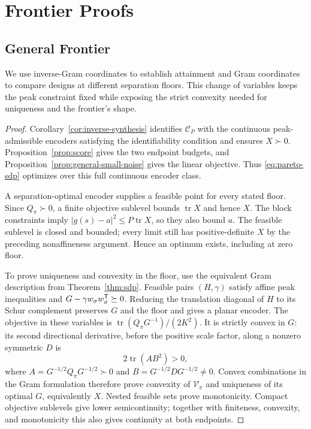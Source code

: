 \section{Frontier Proofs}\label{app:frontier-proofs}

\subsection{General Frontier}\label{app:general-frontier-proof}
We use inverse-Gram coordinates to establish attainment and Gram coordinates to compare designs at different separation floors. This change of variables keeps the peak constraint fixed while exposing the strict convexity needed for uniqueness and the frontier's shape.
\begin{proof}
Corollary~\ref{cor:inverse-synthesis} identifies $\mathcal C_P$ with the continuous peak-admissible encoders satisfying the identifiability condition and ensures $X\succ0$. Proposition~\ref{prop:score} gives the two endpoint budgets, and Proposition~\ref{prop:general-small-noise} gives the linear objective. Thus \eqref{eq:pareto-sdp} optimizes over this full continuous encoder class.

A separation-optimal encoder supplies a feasible point for every stated floor. Since $Q_\pi\succ0$, a finite objective sublevel bounds $\operatorname{tr}X$ and hence $X$. The block constraints imply $|g(s)-a|^2\le P\operatorname{tr}X$, so they also bound $a$. The feasible sublevel is closed and bounded; every limit still has positive-definite $X$ by the preceding nonaffineness argument. Hence an optimum exists, including at zero floor.

To prove uniqueness and convexity in the floor, use the equivalent Gram description from Theorem~\ref{thm:sdp}. Feasible pairs $(H,\gamma)$ satisfy affine peak inequalities and $G-\gamma w_\sigma w_\sigma^\mathsf T\succeq0$. Reducing the translation diagonal of $H$ to its Schur complement preserves $G$ and the floor and gives a planar encoder. The objective in these variables is $\operatorname{tr}(Q_\pi G^{-1})/(2K^2)$. It is strictly convex in $G$: its second directional derivative, before the positive scale factor, along a nonzero symmetric $D$ is
$$2\operatorname{tr}(A B^2)>0,$$
where $A=G^{-1/2}Q_\pi G^{-1/2}\succ0$ and $B=G^{-1/2}DG^{-1/2}\ne0$.
Convex combinations in the Gram formulation therefore prove convexity of $\mathcal V_\pi$ and uniqueness of its optimal $G$, equivalently $X$. Nested feasible sets prove monotonicity. Compact objective sublevels give lower semicontinuity; together with finiteness, convexity, and monotonicity this also gives continuity at both endpoints.


\end{proof}
